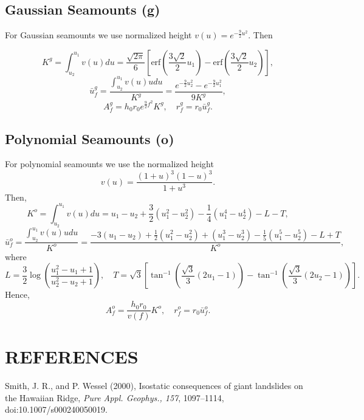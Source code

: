 \documentclass[12pt,letterpaper,margin=0.5in]{report}
\begin{document}
\subsection{Gaussian Seamounts (g)}

For Gaussian seamounts we use normalized height $v(u) = e^{-\frac{9}{2}u^2}$. Then

\begin{equation}
K^g = \int_{u_2}^{u_1} v(u) du = \frac{\sqrt{2\pi}}{6} \left [ \mbox{erf} \left (\frac{3\sqrt{2}}{2}u_1\right ) - \mbox{erf} \left (\frac{3\sqrt{2}}{2}u_2\right ) \right ],
\end{equation}
\begin{equation}
\bar{u}_f^g = \frac{\int_{u_2}^{u_1} v(u) u du}{K^g} = \frac{e^{-\frac{9}{2}u_2^2} - e^{-\frac{9}{2}u_1^2}}{9K^g},
\end{equation}
\begin{equation}
A_f^g = h_0 r_0 e^{\frac{9}{2}f^2} K^g, \quad r_f^g = r_0\bar{u}_f^g.
\end{equation}

\subsection{Polynomial Seamounts (o)}

For polynomial seamounts we use the normalized height
\begin{equation}
v(u) = \frac{(1 + u)^3 (1 - u)^3}{1 + u^3}.
\end{equation}
Then,
\begin{equation}
K^o = \int_{u_2}^{u_1} v(u) du = u_1 - u_2 + \frac{3}{2}\left (u_1^2 - u_2^2 \right ) - \frac{1}{4} \left (u_1^4 - u_2^4\right ) - L - T,
\end{equation}
\begin{equation}
\bar{u}_f^o = \frac{\int_{u_2}^{u_1} v(u) u du}{K^o} = \frac{- 3 (u_1 - u_2) + \frac{1}{2}(u_1^2 - u_2^2) + (u_1^3 - u_2^3) - \frac{1}{5}(u_1^5 - u_2^5) - L + T}{K^o},
\end{equation}
where 
\begin{equation}
L = \frac{3}{2} \log \left ( \frac{u_1^2 - u_1 + 1}{u_2^2 - u_2 + 1}\right ), \quad T = \sqrt{3} \left [ \tan^{-1} \left (\frac{\sqrt{3}}{3}(2u_1 - 1)\right ) - \tan^{-1} \left (\frac{\sqrt{3}}{3}(2u_2 - 1)\right )\right ].
\end{equation}
Hence,
\begin{equation}
A_f^o = \frac{h_0 r_0}{v(f)} K^o, \quad r_f^o = r_0\bar{u}_f^o.
\end{equation}

\section{REFERENCES}

Smith, J. R., and P. Wessel (2000), Isostatic consequences of giant landslides on the Hawaiian Ridge,
{\it Pure Appl. Geophys., 157}, 1097--1114, doi:10.1007/s000240050019.
\end{document}
